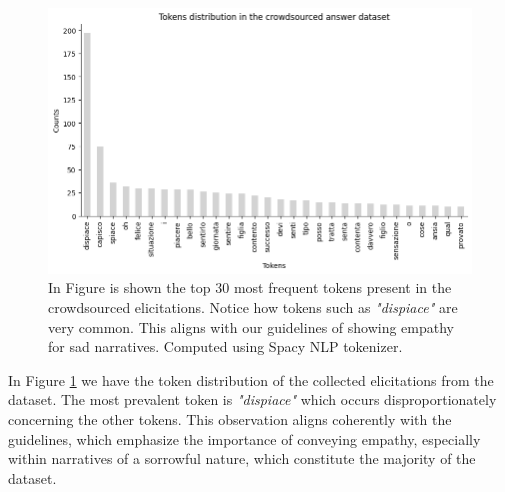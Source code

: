 \begin{figure}[!htbp]
    \centering
    \includegraphics[width=1\linewidth]{assets//imgs/dataset-top-30-answers.png}
    \caption{In Figure is shown the top 30 most frequent tokens present in the crowdsourced elicitations. Notice how tokens such as \emph{"dispiace"} are very common. This aligns with our guidelines of showing empathy for sad narratives. Computed using Spacy NLP tokenizer. }
    \label{fig:dataset-top-30-answers}
\end{figure}

In Figure \ref{fig:dataset-top-30-answers} we have the token distribution of the collected elicitations from the dataset. The most prevalent token is \emph{"dispiace"} which occurs disproportionately concerning the other tokens. This observation aligns coherently with the guidelines, which emphasize the importance of conveying empathy, especially within narratives of a sorrowful nature, which constitute the majority of the dataset.

